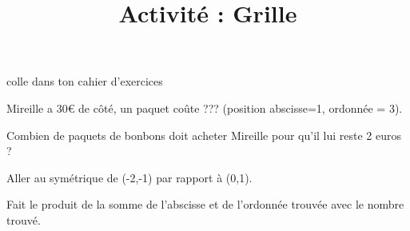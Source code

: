 \documentclass[a4paper,11pt]{article}
\title{Activité : Grille}
\date{}
\author{}
\makeatletter
\renewcommand{\maketitle}{%
{\scriptsize colle dans ton cahier d'exercices}
	\begin{center}
		\LARGE
		\uline{\@title}
		\vspace{0.5em}
	\end{center}
}
\makeatother
\begin{document}
\maketitle


\begin{exercice}
	Mireille a 30€ de côté, un paquet coûte ??? (position abscisse=1, ordonnée = 3).

	Combien de paquets de bonbons doit acheter Mireille pour qu'il lui reste 2 euros ?

\end{exercice}

\begin{exercice}
	Aller au symétrique de (-2,-1) par rapport à (0,1).


	Fait le produit de la somme de l'abscisse et de l'ordonnée trouvée avec le nombre trouvé.
\end{exercice}

\begin{exercice}
	
\end{exercice}
\end{document}

